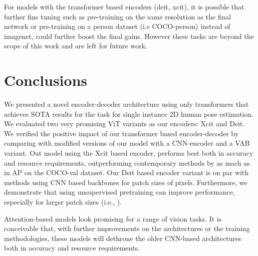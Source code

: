 \documentclass[runningheads]{llncs}
\begin{document}
For models with the transformer based encoders (deit, xcit), it is possible that further fine tuning such as pre-training on the same resolution as the final network or pre-training on a person dataset (i.e COCO-person) instead of imagenet, could further boost the final gains. 
However these tasks are beyond the scope of this work and are left for future work.

\section{Conclusions}
We presented a novel encoder-decoder architecture using only transformers that achieves SOTA results for the task for single instance 2D human pose estimation. We evaluated two very promising ViT variants as our encoders: Xcit and Deit. We verified the positive impact of our transformer based encoder-decoder by comparing with modified versions of our model with a CNN-encoder and a VAB variant.
Out model using the Xcit based encoder, performs best both in accuracy and resource requirements, outperforming contemporary methods by as mach as  in AP on the COCO-val dataset.
Our Deit based encoder variant is on par with methods using CNN based backbones for patch sizes of  pixels.
Furthermore, we demonstrate that using unsupervised pretraining can improve performance, especially for larger patch sizes (i.e., ). 

Attention-based models look promising for a range of vision tasks.
It is conceivable that, with further improvements on the architectures or 
the training methodologies, these models will dethrone the older CNN-based 
architectures both in accuracy and resource requirements.



\end{document}
